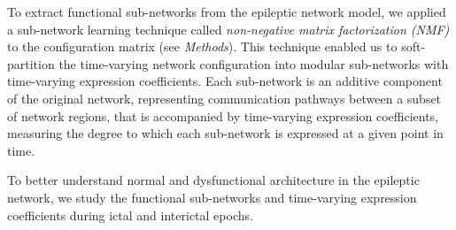 To extract functional sub-networks from the epileptic network model, we applied a sub-network learning technique called \textit{non-negative matrix factorization (NMF)} to the configuration matrix (see \textit{Methods}). This technique enabled us to soft-partition the time-varying network configuration into modular sub-networks with time-varying expression coefficients. Each sub-network is an additive component of the original network, representing communication pathways between a subset of network regions, that is accompanied by time-varying expression coefficients, measuring the degree to which each sub-network is expressed at a given point in time.

To better understand normal and dysfunctional architecture in the epileptic network, we study the functional sub-networks and time-varying expression coefficients during ictal and interictal epochs.

